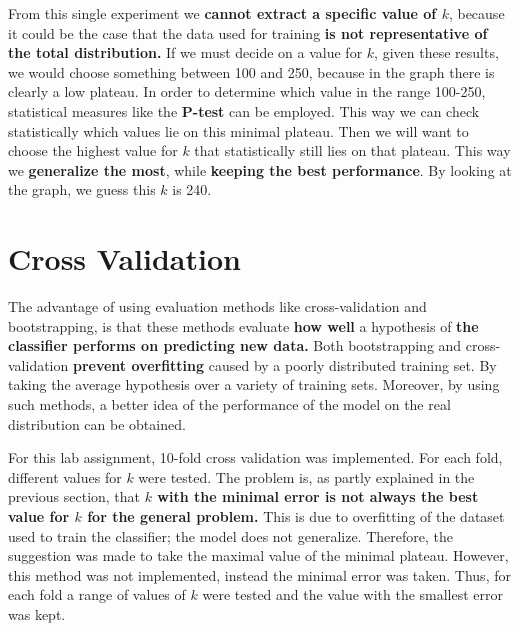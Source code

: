 \documentclass[a4paper]{article}
\begin{document}
From this single experiment we \textbf{cannot extract a specific value of $k$}, because it could be the case that the data used for training \textbf{is not representative of the total distribution.} 
If we must decide on a value for $k$, given these results, we would choose something between 100 and 250, because in the graph there is clearly a low plateau. In order to determine which value in the range 100-250, statistical measures like the \textbf{P-test} can be employed. This way we can check statistically which values lie on this minimal plateau. Then we will want to choose the highest value for $k$ that statistically still lies on that plateau. This way we \textbf{generalize the most}, while \textbf{keeping the best performance}. By looking at the graph, we guess this $k$ is 240.

\section{Cross Validation}
The advantage of using evaluation methods like cross-validation and bootstrapping, is that these methods evaluate \textbf{how well} a hypothesis of \textbf{the classifier performs on predicting new data.} Both bootstrapping and cross-validation \textbf{prevent overfitting} caused by a poorly distributed training set. By taking the average hypothesis over a variety of training sets.
Moreover, by using such methods, a better idea of the performance of the model on the real distribution can be obtained.

For this lab assignment, 10-fold cross validation was implemented. For each fold, different values for $k$ were tested. The problem is, as partly explained in the previous section, that \textbf{$k$ with the minimal error is not always the best value for $k$ for the general problem.} This is due to overfitting of the dataset used to train the classifier; the model does not generalize. Therefore, the suggestion was made to take the maximal value of the minimal plateau. However, this method was not implemented, instead the minimal error was taken. Thus, for each fold a range of values of $k$ were tested and the value with the smallest error was kept.
\end{document}

